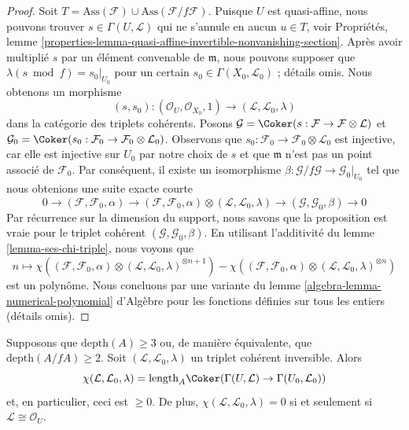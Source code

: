 \begin{proof}
\medskip\noindent
Soit $T = \text{Ass}(\mathcal{F}) \cup \text{Ass}(\mathcal{F}/f\mathcal{F})$.
Puisque $U$ est quasi-affine, nous pouvons trouver $s \in \Gamma(U, \mathcal{L})$
qui ne s'annule en aucun $u \in T$, voir
Propriétés, lemme
\ref{properties-lemma-quasi-affine-invertible-nonvanishing-section}.
Après avoir multiplié $s$ par un élément convenable de $\mathfrak m$,
nous pouvons supposer que $\lambda(s \bmod f) = s_0|_{U_0}$ pour un certain
$s_0 \in \Gamma(X_0, \mathcal{L}_0)$ ; détails omis.
Nous obtenons un morphisme
$$
(s, s_0) :
(\mathcal{O}_U, \mathcal{O}_{X_0}, 1)
\longrightarrow
(\mathcal{L}, \mathcal{L}_0, \lambda)
$$
dans la catégorie des triplets cohérents. Posons
$\mathcal{G} = \Coker(s : \mathcal{F} \to \mathcal{F} \otimes \mathcal{L})$
et
$\mathcal{G}_0 = \Coker(s_0 : \mathcal{F}_0 \to
\mathcal{F}_0 \otimes \mathcal{L}_0)$. Observons que $s_0 : \mathcal{F}_0 \to
\mathcal{F}_0 \otimes \mathcal{L}_0$ est injective, car elle est injective
sur $U_0$ par notre choix de $s$ et que $\mathfrak m$ n'est pas un
point associé de $\mathcal{F}_0$. Par conséquent,
il existe un
isomorphisme $\beta : \mathcal{G}/f\mathcal{G} \to \mathcal{G}_0|_{U_0}$
tel que nous obtenions une suite exacte courte
$$
0 \to
(\mathcal{F}, \mathcal{F}_0, \alpha) \to
(\mathcal{F}, \mathcal{F}_0, \alpha) \otimes
(\mathcal{L}, \mathcal{L}_0, \lambda) \to
(\mathcal{G}, \mathcal{G}_0, \beta) \to 0
$$
Par récurrence sur la dimension du support, nous savons que la proposition
est vraie pour le triplet cohérent $(\mathcal{G}, \mathcal{G}_0, \beta)$.
En utilisant l'additivité du lemme \ref{lemma-ses-chi-triple},
nous voyons que
$$
n \longmapsto 
\chi((\mathcal{F}, \mathcal{F}_0, \alpha) \otimes
(\mathcal{L}, \mathcal{L}_0, \lambda)^{\otimes n + 1})
-
\chi((\mathcal{F}, \mathcal{F}_0, \alpha) \otimes
(\mathcal{L}, \mathcal{L}_0, \lambda)^{\otimes n})
$$
est un polynôme. Nous concluons par une variante du
lemme \ref{algebra-lemma-numerical-polynomial} d'Algèbre
pour les fonctions définies sur tous les entiers (détails omis).
\end{proof}

\begin{lemma}
\label{lemma-nonnegative-chi-triple}
Supposons que $\text{depth}(A) \geq 3$ ou, de manière équivalente, que
$\text{depth}(A/fA) \geq 2$. Soit $(\mathcal{L}, \mathcal{L}_0, \lambda)$
un triplet cohérent inversible. Alors
$$
\chi(\mathcal{L}, \mathcal{L}_0, \lambda) =
\text{length}_A \Coker(\Gamma(U, \mathcal{L}) \to \Gamma(U_0, \mathcal{L}_0))
$$
et, en particulier, ceci est $\geq 0$. De plus, 
$\chi(\mathcal{L}, \mathcal{L}_0, \lambda) = 0$ si et seulement si
$\mathcal{L} \cong \mathcal{O}_U$.
\end{lemma}

